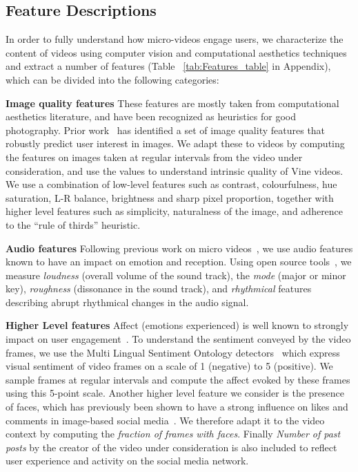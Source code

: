 \subsection{Feature Descriptions}
\label{sec:features}
In order to fully understand how micro-videos engage users, we characterize the content of videos using computer vision and computational aesthetics techniques and  extract a number of features (Table ~\ref{tab:Features_table} in Appendix), which can be divided into the following categories: 

\noindent\textbf{Image quality features} These features are mostly taken from computational aesthetics literature, and have been recognized as heuristics for good photography. Prior work~\cite{predictingPintrest} has identified a set of image quality features that robustly predict user interest in images. We  adapt these to videos by computing  the features on images taken at regular intervals from the video under consideration, and use the values to understand intrinsic quality of Vine videos. We use a combination of low-level features such as contrast, colourfulness, hue saturation, L-R balance, brightness and sharp pixel proportion, together with higher level features such as simplicity, naturalness of the image, and adherence to the  ``rule of thirds'' heuristic. 

\noindent\textbf{Audio features}	
Following previous work on micro videos~\cite{redi20146}, we use audio features known to have an impact on emotion and reception. Using open source tools~\cite{lartillot2007matlab,laurier2009exploring}, we measure \emph{loudness} (overall volume of the sound track), the \emph{mode} (major or minor key), \emph{roughness} (dissonance in the sound track), and \emph{rhythmical} features describing abrupt rhythmical changes in the audio signal. 

\noindent\textbf{Higher Level features} Affect (emotions experienced) is well known to strongly impact on user engagement~\cite{o2008user,leung2009user}. To understand the sentiment conveyed by the video frames, we use the Multi Lingual Sentiment Ontology detectors~\cite{jou2015visual} which express visual sentiment of video frames on a scale of 1 (negative) to 5 (positive). We sample frames at regular intervals and compute the affect evoked by these frames using this 5-point scale. Another higher level feature we consider is the presence of faces, which has previously been shown to have a strong influence on  likes and comments in image-based social media~\cite{bakhshi2014faces}. We therefore adapt it to the video context by computing the \emph{fraction of frames with faces}. Finally \emph{Number of past posts} by the creator of the video under consideration is also included to reflect user experience and activity on the social media network.

